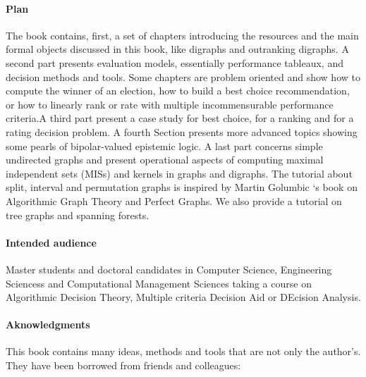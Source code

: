 \paragraph{Plan}

\noindent The book contains, first, a set of chapters introducing the \Digraph resources and the main formal objects discussed in this book, like digraphs and outranking digraphs. A second part presents evaluation models, essentially performance tableaux, and decision methods and tools. Some chapters are problem oriented and show how to compute the winner of an election, how to build a best choice recommendation, or how to linearly rank or rate with multiple incommensurable performance criteria.A third part present a case study for best choice, for a ranking and for a rating decision problem. A fourth Section presents more advanced topics showing some pearls of bipolar-valued epistemic logic. A last part concerns simple undirected graphs and present operational aspects of computing maximal independent sets (MISs) and kernels in graphs and digraphs. The tutorial about split, interval and permutation graphs is inspired by Martin Golumbic ‘s book on Algorithmic Graph Theory and Perfect Graphs. We also provide a tutorial on tree graphs and spanning forests.

\paragraph{Intended audience}

Master students and doctoral candidates in Computer Science, Engineering Sciencess and Computational Management Sciences taking a course on Algorithmic Decision Theory, Multiple criteria Decision Aid or DEcision Analysis.

\paragraph{Aknowledgments}

This book contains many ideas, methods and tools that are not only the author’s. They have been borrowed from friends and colleagues: 

